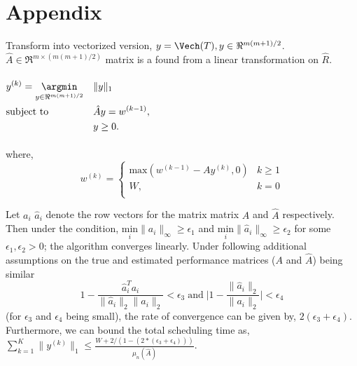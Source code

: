 \section{Appendix}
Transform into vectorized version, $y = \Vech(T), y \in \Re^{m(m+1)/2}$. $\hat{A} \in \Re^{ m \times (m(m+1)/2)}$ matrix is a found from a  linear transformation on $\hat{R}$.
\\
\\
$ 
\begin{aligned}
\centering
			\label{eq:controller}
			&   y^{(k)} =\underset{  y \in \Re^{m(m+1)/2}}{\argmin}  &&   \| y \|_1\\
			&   \text{subject to} &&   \hat{A}y = w^{(k-1)},\\
			&&&	  y \geq 0.\\
\end{aligned}
$
\\
\\
where,
\begin{equation}
w^{(k)} = 
\begin{cases} 
 \text{max}(w^{(k-1)} -  A y^{(k)},0)  &k\geq1\\
W, & k=0\\
\end{cases}
\end{equation}

\begin{thm}
Let $a_i$ $\hat{a}_i$  denote the row vectors for the matrix matrix $A$ and $\hat{A}$ respectively. Then under the condition,  $ \underset{i}{\mathrm{min}}  \|a_i\|_{\infty} \geq \epsilon_1$ and $\underset{i}{\mathrm{min}} \|\hat{a}_i\|_{\infty} \geq \epsilon_2$ for some $\epsilon_1, \epsilon_2 >0$; the algorithm converges linearly. Under  following  additional assumptions on the true and estimated performance matrices ($A$ and $\hat{A}$) being similar
\begin{equation}
\label{eq:condition}
1 - \frac{\hat{a}_i^{T} a_i}{\|\hat{a}_i\|_2 \|a_i\|_2} < \epsilon_3 \; \mathrm{and} \; \bigg| 1 - \frac{\|\hat{a}_i\|_2 }{\|a_i\|_2} \bigg|< \epsilon_4
\end{equation}
(for $\epsilon_3$ and $\epsilon_4$ being small), the rate of convergence can be given by,  $2(\epsilon_3 +\epsilon_4)$. Furthermore, we can bound the total scheduling time as, $\sum_{k=1}^K \|y^{(k)}\|_1 \leq \frac{W + 2/(1-(2*(\epsilon_3+\epsilon_4))) }{\mu_n(\hat{A})}$.
 \end{thm}



